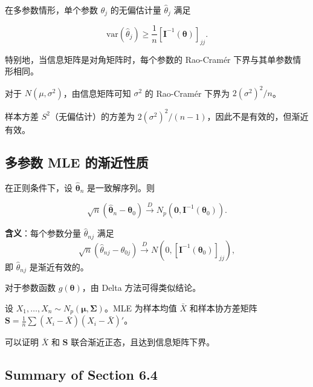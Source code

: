 在多参数情形，单个参数 $\theta_j$ 的无偏估计量 $\widehat{\theta}_j$ 满足

\[
\text{var}(\widehat{\theta}_j) \geq \frac{1}{n} [\mathbf{I}^{-1}(\boldsymbol{\theta})]_{jj}.
\label{eq:multiparameter-rao-cramer}
\]

特别地，当信息矩阵是对角矩阵时，每个参数的 Rao-Cramér 下界与其单参数情形相同。

\begin{example}[正态方差估计的效率]\label{ex:normal-variance-efficiency}
对于 $N(\mu, \sigma^2)$，由信息矩阵可知 $\sigma^2$ 的 Rao-Cramér 下界为 $2(\sigma^2)^2/n$。

样本方差 $S^2$（无偏估计）的方差为 $2(\sigma^2)^2/(n-1)$，因此不是有效的，但渐近有效。
\end{example}

\subsection{多参数 MLE 的渐近性质}

\begin{theorem}\label{th:multiparameter-mle-asymptotic}
在正则条件下，设 $\widehat{\boldsymbol{\theta}}_n$ 是一致解序列。则

\[
\sqrt{n}(\widehat{\boldsymbol{\theta}}_n - \boldsymbol{\theta}_0) \xrightarrow{D} N_p(\mathbf{0}, \mathbf{I}^{-1}(\boldsymbol{\theta}_0)).
\label{eq:multiparameter-mle-asymptotic}
\]
\end{theorem}

\textbf{含义}：每个参数分量 $\widehat{\theta}_{nj}$ 满足
\[
\sqrt{n}(\widehat{\theta}_{nj} - \theta_{0j}) \xrightarrow{D} N(0, [\mathbf{I}^{-1}(\boldsymbol{\theta}_0)]_{jj}),
\]
即 $\widehat{\theta}_{nj}$ 是渐近有效的。

对于参数函数 $g(\boldsymbol{\theta})$，由 Delta 方法可得类似结论。

\begin{example}[正态协方差矩阵估计]\label{ex:covariance-estimation}
设 $X_1, \ldots, X_n \sim N_p(\boldsymbol{\mu}, \boldsymbol{\Sigma})$。MLE 为样本均值 $\bar{X}$ 和样本协方差矩阵 $\mathbf{S} = \frac{1}{n}\sum(X_i - \bar{X})(X_i - \bar{X})'$。

可以证明 $\bar{X}$ 和 $\mathbf{S}$ 联合渐近正态，且达到信息矩阵下界。
\end{example}

\subsection{Summary of Section 6.4}

